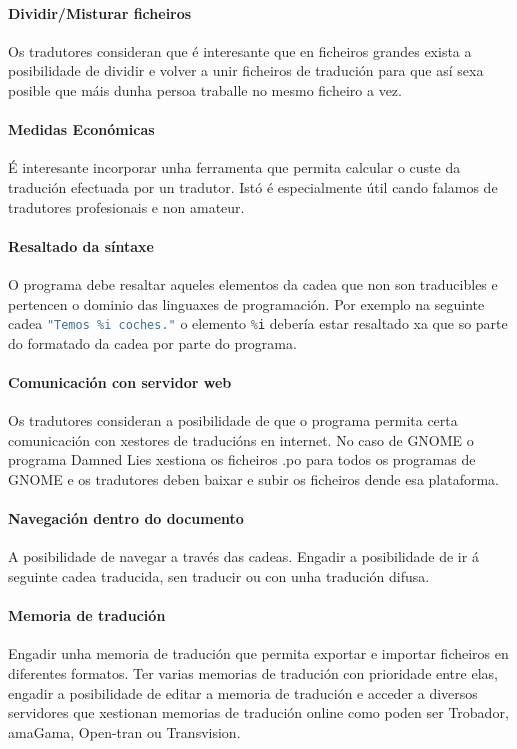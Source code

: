 	\paragraph{Dividir/Misturar ficheiros} Os tradutores consideran que é interesante que en ficheiros grandes exista a posibilidade de dividir e volver a unir ficheiros de tradución para que así sexa posible que máis dunha persoa traballe no mesmo ficheiro a vez.

	\paragraph{Medidas Económicas} É interesante incorporar unha ferramenta que permita calcular o custe da tradución efectuada por un tradutor. Istó é especialmente útil cando falamos de tradutores profesionais e non amateur.

	\paragraph{Resaltado da síntaxe} O programa debe resaltar aqueles elementos da cadea que non son traducibles e pertencen o dominio das linguaxes de programación. Por exemplo na seguinte cadea \lstinline[language=C]{"Temos %i coches."} o elemento \lstinline[language=C]{%i} debería estar resaltado xa que so parte do formatado da cadea por parte do programa.

	\paragraph{Comunicación con servidor web} Os tradutores consideran a posibilidade de que o programa permita certa comunicación con xestores de traducións en internet. No caso de GNOME o programa Damned Lies xestiona os ficheiros .po para todos os programas de GNOME e os tradutores deben baixar e subir os ficheiros dende esa plataforma.

	\paragraph{Navegación dentro do documento} A posibilidade de navegar a través das cadeas. Engadir a posibilidade de ir á seguinte cadea traducida, sen traducir ou con unha tradución difusa.

	\paragraph{Memoria de tradución} Engadir unha memoria de tradución que permita exportar e importar ficheiros en diferentes formatos. Ter varias memorias  de tradución con prioridade entre elas, engadir a posibilidade de editar a memoria de tradución e acceder a diversos servidores que xestionan memorias de tradución online como poden ser Trobador, amaGama, Open-tran ou Transvision.

